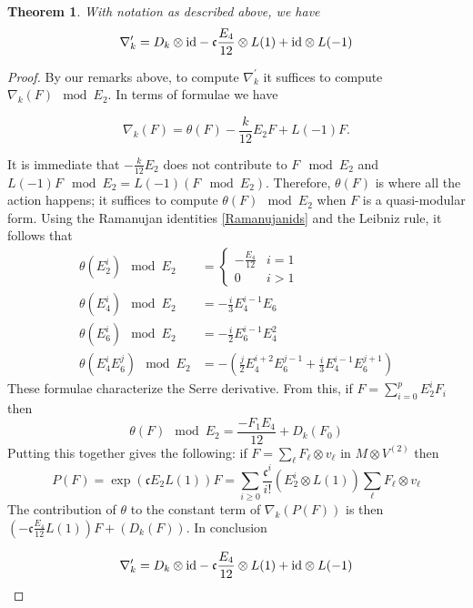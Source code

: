 \documentclass[12pt]{amsart}
\theoremstyle{plain}
\newtheorem{thm}{Theorem}[section]
\theoremstyle{definition}
\theoremstyle{remark}
\begin{document}
    \begin{thm}
    With notation as described above, we have
   \[\nabla_{k}^\prime=D_{k}\otimes\textnormal{id}-\mathfrak{c}\frac{E_4}{12}\otimes L(1)+\textnormal{id}\otimes L(-1) \]

    \end{thm}
    \begin{proof}
By our remarks above, to compute $\nabla_{k}^\prime$ it suffices to compute $\nabla_{k}(F)\mod E_2$. In terms of formulae we have

\[\nabla_{k}(F)=\theta(F)-\frac{k}{12}E_2F+L(-1)F.\]

It is immediate that $-\frac{k}{12}E_2$ does not contribute to $F\mod E_2$ and $L(-1)F\mod E_2=L(-1)(F\mod E_2)$. Therefore, $\theta(F)$ is where all the action happens; it suffices to compute $\theta(F)\mod E_2$ when $F$ is a quasi-modular form. Using the Ramanujan identities \ref{Ramanujanids} and the Leibniz rule, it follows that
\begin{align*}
\theta(E_2^i)\mod E_2&=\begin{cases}-\frac{E_4}{12} &i=1\\
0 &i>1\end{cases}
\\
\theta(E_4^i)\mod E_2 &=-\frac{i}{3}E_4^{i-1}E_6\\
\theta(E_6^i)\mod E_2&=-\frac{i}{2}E_6^{i-1}E_4^2\\
\theta(E_4^iE_6^j)\mod E_2&=-\left(\frac{j}{2}E_4^{i+2}E_6^{j-1}+\frac{i}{3}E_4^{i-1}E_6^{j+1}\right)
\end{align*}
These formulae characterize the Serre derivative. From this, if $F=\sum_{i=0}^pE_2^iF_i$ then 
\[\theta(F)\mod E_2=\frac{-F_1E_4}{12}+D_{k}(F_0)\]
Putting this together gives the following: if $F=\sum_{\ell}F_\ell\otimes v_\ell$ in $M\otimes V^{(2)}$ then 
\[P(F)=\exp(\mathfrak{c}E_2L(1))F=\sum_{i\geq 0}\frac{\mathfrak{c}^i}{i!}(E_2^i\otimes L(1))\sum_\ell F_\ell\otimes v_\ell\]
The contribution of $\theta$ to the constant term of $\nabla_{k}(P(F))$ is then $(-\mathfrak{c}\frac{E_4}{12}L(1))F+(D_{k}(F))$. In conclusion

\[\nabla_{k}^\prime=D_{k}\otimes\textnormal{id}-\mathfrak{c}\frac{E_4}{12}\otimes L(1)+\textnormal{id}\otimes L(-1) \]
\end{proof}
\end{document}
